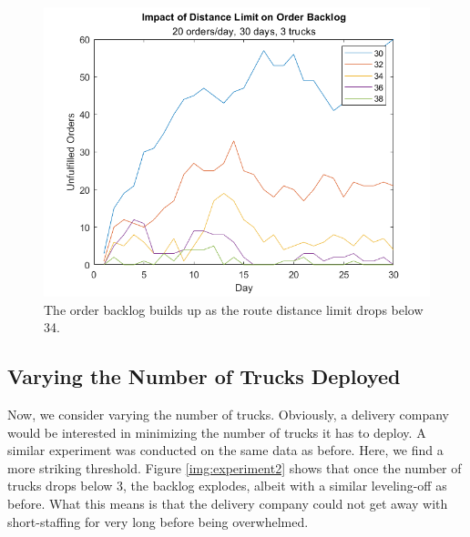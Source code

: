 \documentclass[letterpaper]{article}
\begin{document}
    \begin{figure}[h]
        \centering
        \caption{The order backlog builds up as the route distance limit drops below 34.}
        \label{img:experiment1}
        \includegraphics[width=\textwidth]{experiment1.png}
    \end{figure}

    \subsection{Varying the Number of Trucks Deployed}
    \label{subsection:Varying_the_Number_of_Trucks_Deployed}
    Now, we consider varying the number of trucks. Obviously, a delivery company would be interested in minimizing the number of trucks it has to deploy. A similar experiment was conducted on the same data as before. Here, we find a more striking threshold. Figure \ref{img:experiment2} shows that once the number of trucks drops below 3, the backlog explodes, albeit with a similar leveling-off as before. What this means is that the delivery company could not get away with short-staffing for very long before being overwhelmed.
\end{document}
